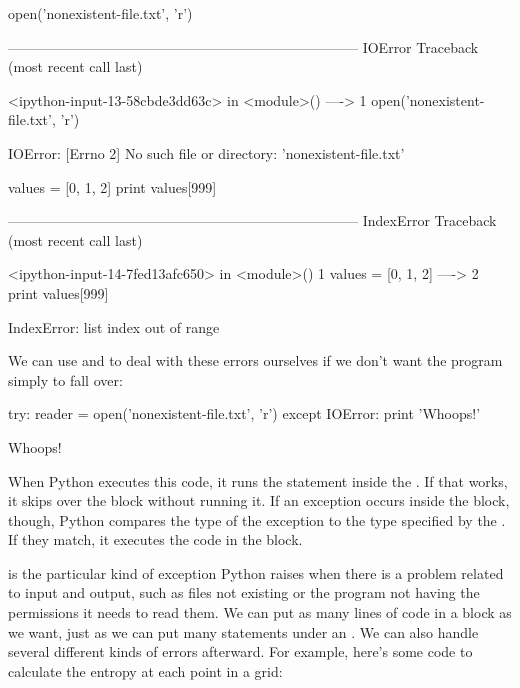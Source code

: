 \begin{VerbIn}
open('nonexistent-file.txt', 'r')
\end{VerbIn}

\begin{VerbErr}
---------------------------------------------------------------------------
IOError                                   Traceback (most recent call last)

<ipython-input-13-58cbde3dd63c> in <module>()
----> 1 open('nonexistent-file.txt', 'r')

IOError: [Errno 2] No such file or directory: 'nonexistent-file.txt'
\end{VerbErr}

\begin{VerbIn}
values = [0, 1, 2]
print values[999]
\end{VerbIn}

\begin{VerbErr}
---------------------------------------------------------------------------
IndexError                                Traceback (most recent call last)

<ipython-input-14-7fed13afc650> in <module>()
1 values = [0, 1, 2]
----> 2 print values[999]

IndexError: list index out of range
\end{VerbErr}

We can use  and  to deal with these errors
ourselves if we don't want the program simply to fall over:

\begin{VerbIn}
try:
    reader = open('nonexistent-file.txt', 'r')
except IOError:
    print 'Whoops!'
\end{VerbIn}

\begin{VerbOut}
Whoops!
\end{VerbOut}

When Python executes this code, it runs the statement inside the
. If that works, it skips over the  block
without running it. If an exception occurs inside the 
block, though, Python compares the type of the exception to the type
specified by the . If they match, it executes the code in
the  block.

 is the particular kind of exception Python raises when
there is a problem related to input and output, such as files not
existing or the program not having the permissions it needs to read
them. We can put as many lines of code in a  block as we
want, just as we can put many statements under an . We can
also handle several different kinds of errors afterward. For example,
here's some code to calculate the entropy at each point in a grid:

